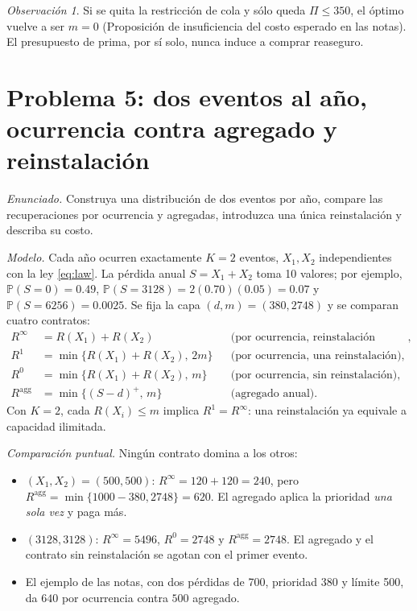 \documentclass[11pt,reqno]{amsart}
\theoremstyle{definition}\newtheorem{definition}[theorem]{Definición}
\theoremstyle{remark}\newtheorem{remark}[theorem]{Observación}
\newcommand{\Prob}{\mathbb P}
\newcommand{\pos}[1]{(#1)^+}
\begin{document}
\begin{remark}
Si se quita la restricción de cola y sólo queda $\Pi\le350$, el óptimo vuelve a ser $m=0$ (Proposición de insuficiencia del costo esperado en las notas). El presupuesto de prima, por sí solo, nunca induce a comprar reaseguro.
\end{remark}

\section{Problema 5: dos eventos al año, ocurrencia contra agregado y reinstalación}
\emph{Enunciado.} Construya una distribución de dos eventos por año, compare las recuperaciones por ocurrencia y agregadas, introduzca una única reinstalación y describa su costo.

\emph{Modelo.} Cada año ocurren exactamente $K=2$ eventos, $X_1,X_2$ independientes con la ley \eqref{eq:law}. La pérdida anual $S=X_1+X_2$ toma 10 valores; por ejemplo, $\Prob(S=0)=0.49$, $\Prob(S=3128)=2(0.70)(0.05)=0.07$ y $\Prob(S=6256)=0.0025$. Se fija la capa $(d,m)=(380,2748)$ y se comparan cuatro contratos:
\begin{align*}
R^{\infty}&=R(X_1)+R(X_2) &&\text{(por ocurrencia, reinstalación ilimitada)},\\
R^{1}&=\min\{R(X_1)+R(X_2),\,2m\} &&\text{(por ocurrencia, una reinstalación)},\\
R^{0}&=\min\{R(X_1)+R(X_2),\,m\} &&\text{(por ocurrencia, sin reinstalación)},\\
R^{\mathrm{agg}}&=\min\{\pos{S-d},\,m\} &&\text{(agregado anual)}.
\end{align*}
Con $K=2$, cada $R(X_i)\le m$ implica $R^{1}=R^{\infty}$: una reinstalación ya equivale a capacidad ilimitada.

\emph{Comparación puntual.} Ningún contrato domina a los otros:
\begin{itemize}[leftmargin=2em]
\item $(X_1,X_2)=(500,500)$: $R^{\infty}=120+120=240$, pero $R^{\mathrm{agg}}=\min\{1000-380,2748\}=620$. El agregado aplica la prioridad \emph{una sola vez} y paga más.
\item $(3128,3128)$: $R^{\infty}=5496$, $R^{0}=2748$ y $R^{\mathrm{agg}}=2748$. El agregado y el contrato sin reinstalación se agotan con el primer evento.
\item El ejemplo de las notas, con dos pérdidas de 700, prioridad 380 y límite 500, da $640$ por ocurrencia contra $500$ agregado.
\end{itemize}
\end{document}
